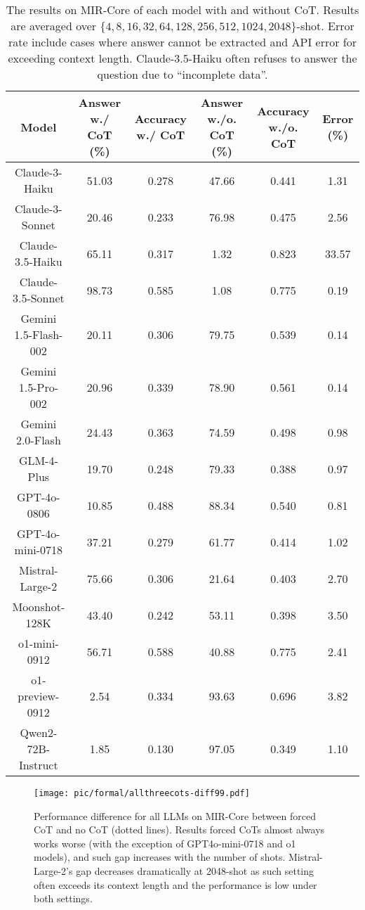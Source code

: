\begin{table}[ht]
    \centering
    \scriptsize
    \caption{The results on MIR-Core of each model with and without CoT. Results are averaged over $\{4,8,16,32,64,128,256,512,1024,2048\}$-shot. Error rate include cases where answer cannot be extracted and API error for exceeding context length. Claude-3.5-Haiku often refuses to answer the question due to ``incomplete data''.}
    \begin{tabular}{cccccc}
    \toprule
        Model & Answer w./ CoT (\%) & Accuracy w./ CoT & Answer w./o. CoT (\%) & Accuracy w./o. CoT & Error (\%)  
        \\
        \midrule
        Claude-3-Haiku  & 51.03 & 0.278 & 47.66 & 0.441 & 1.31 \\
        Claude-3-Sonnet & 20.46 & 0.233 & 76.98 & 0.475 & 2.56 \\
        Claude-3.5-Haiku & 65.11 & 0.317 & 1.32 & 0.823 & 33.57 \\
        Claude-3.5-Sonnet & 98.73 & 0.585 & 1.08 & 0.775 & 0.19 \\
        Gemini 1.5-Flash-002 & 20.11 & 0.306 & 79.75 & 0.539 & 0.14 \\
        Gemini 1.5-Pro-002 & 20.96 & 0.339 & 78.90 & 0.561 & 0.14 \\
        Gemini 2.0-Flash & 24.43 & 0.363 & 74.59 & 0.498 & 0.98 \\
        GLM-4-Plus & 19.70 & 0.248 & 79.33 & 0.388 & 0.97 \\
        GPT-4o-0806 & 10.85 & 0.488 & 88.34 & 0.540 & 0.81 \\
        GPT-4o-mini-0718 & 37.21 & 0.279 & 61.77 & 0.414 & 1.02 \\
        Mistral-Large-2 & 75.66 & 0.306 & 21.64 & 0.403 & 2.70 \\
        Moonshot-128K & 43.40 & 0.242 & 53.11 & 0.398 & 3.50 \\
        o1-mini-0912 & 56.71 & 0.588 & 40.88 & 0.775 & 2.41 \\
        o1-preview-0912 & 2.54 & 0.334 & 93.63 & 0.696 & 3.82 \\
        Qwen2-72B-Instruct & 1.85 & 0.130 & 97.05 & 0.349 & 1.10 \\
         \bottomrule
    \end{tabular}
    
    \label{tab:cot_abl}
\end{table}

\begin{figure}
    \centering
    \texttt{[image: pic/formal/allthreecots-diff99.pdf]}
    \caption{Performance difference for all LLMs on MIR-Core between forced CoT and no CoT (dotted lines). Results forced CoTs almost always works worse (with the exception of GPT4o-mini-0718 and o1 models), and such gap increases with the number of shots. Mistral-Large-2's gap decreases dramatically at 2048-shot as such setting often exceeds its context length and the performance is low under both settings.}
    \label{fig:fig_moremodels_cot}
\end{figure}

